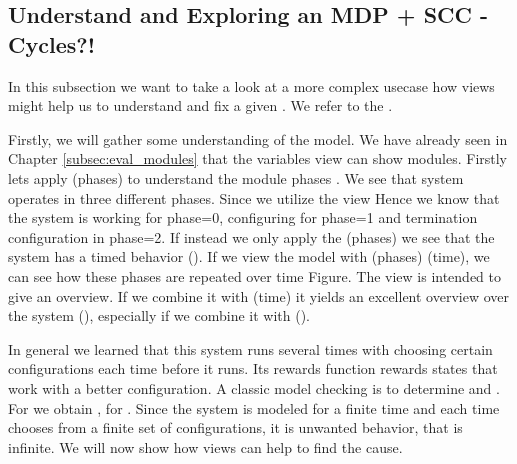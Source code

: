 \documentclass[preview]{standalone}
\begin{document}

\subsection{Understand and Exploring an MDP + SCC - Cycles?!}

In this subsection we want to take a look at a more complex usecase how views might help us to understand and fix a given \mdpN. We refer to the \mdp {}.

Firstly, we will gather some understanding of the model. We have already seen in Chapter \ref{subsec:eval_modules} that the variables view can show modules. Firstly lets apply \viewparamvalident(phases) to understand the module phases . We see that system operates in three different phases. Since we utilize the view \viewstrongoutactident  Hence we know that the system is working for phase=0, configuring for phase=1 and termination configuration in phase=2. If instead we only apply the \viewN \viewparamvalident(phases) we see that the system has a timed behavior (). If we view the model with \viewparamvalident(phases) \pll \viewparamvalident(time), we can see how these phases are repeated over time {Figure}. The view \viewscc is intended to give an overview. If we combine it with \viewparamvalident(time) it yields an excellent overview over the system (), especially if we combine it with \viewinitstates (). 

In general we learned that this system runs several times with choosing certain configurations each time before it runs. Its rewards function rewards states that work with a better configuration. A classic model checking  is to determine  and . For  we obtain , for  . Since the system is modeled for a finite time and each time chooses from a finite set of configurations, it is unwanted behavior, that  is infinite. We will now show how views can help to find the cause.
\end{document}
